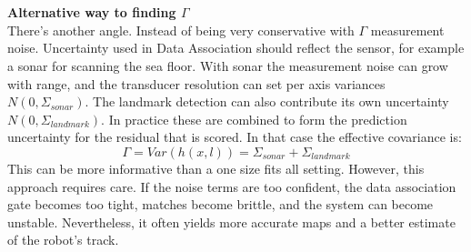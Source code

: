 \\ \\
\textbf{Alternative way to finding $\Gamma$} 
\\ \noindent
There's another angle. Instead of being very conservative with $\Gamma$ measurement noise. Uncertainty used in Data Association should reflect the sensor, for example a sonar for scanning the sea floor. With sonar the measurement noise can grow with range, and the transducer resolution can set per axis variances $N(0, \Sigma_{sonar})$. The landmark detection can also contribute its own uncertainty $N(0, \Sigma_{landmark})$. In practice these are combined to form the prediction uncertainty for the residual that is scored. In that case the effective covariance is:
$$
    \Gamma = Var(h(x, l)) = \Sigma_{sonar} + \Sigma_{landmark}
$$
This can be more informative than a one size fits all setting. However, this approach requires care. If the noise terms are too confident, the data association gate becomes too tight, matches become brittle, and the system can become unstable. Nevertheless, it often yields more accurate maps and a better estimate of the robot's track.



